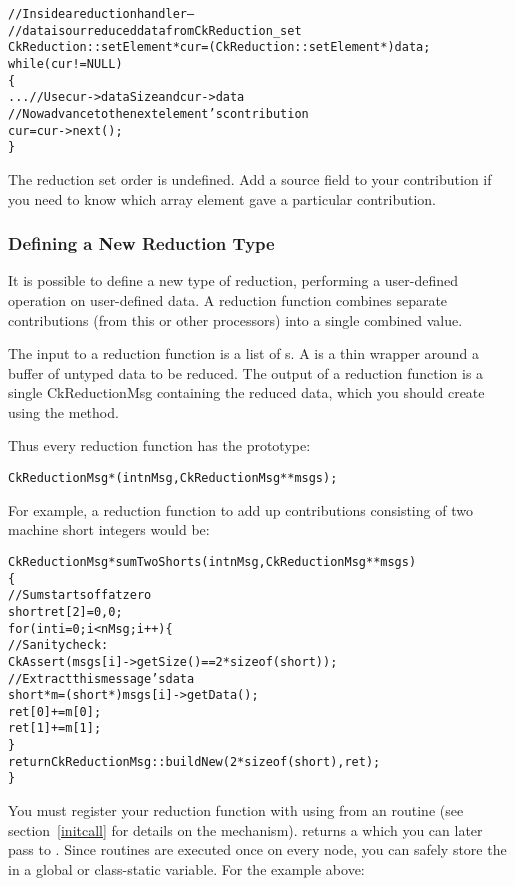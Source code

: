 \begin{alltt}
  //Inside a reduction handler-- 
  //  data is our reduced data from CkReduction_set
  CkReduction::setElement *cur=(CkReduction::setElement *)data;
  while (cur!=NULL)
  \{
    ... //Use cur->dataSize and cur->data
    //Now advance to the next element's contribution
    cur=cur->next();
  \}
\end{alltt}

The reduction set order is undefined.  Add a source field to your contribution
if you need to know which array element gave a particular contribution.

\subsubsection{Defining a New Reduction Type}
\label{new_type_reduction}

It is possible to define a new type of reduction, performing a 
user-defined operation on user-defined data.  A reduction function
combines separate contributions (from this or other processors)
into a single combined value.

The input to a reduction function is a list of s.
A  is a thin wrapper around a buffer of untyped data
to be reduced.  
The output of a reduction function is a single CkReductionMsg
containing the reduced data, which you should create using the
 method.  

Thus every reduction function has the prototype:
\begin{alltt}
CkReductionMsg *(int nMsg,CkReductionMsg **msgs);
\end{alltt}

For example, a reduction function to add up contributions 
consisting of two machine short integers would be:

\begin{alltt}
CkReductionMsg *sumTwoShorts(int nMsg,CkReductionMsg **msgs)
\{
  //Sum starts off at zero
  short ret[2]={0,0};
  for (int i=0;i<nMsg;i++) \{
    //Sanity check:
    CkAssert(msgs[i]->getSize()==2*sizeof(short));
    //Extract this message's data
    short *m=(short *)msgs[i]->getData();
    ret[0]+=m[0];
    ret[1]+=m[1];
  \}
  return CkReductionMsg::buildNew(2*sizeof(short),ret);
\}
\end{alltt}

You must register your reduction function with \charmpp{} 
using  from
an  routine (see section~\ref{initcall} for details
on the  mechanism).   
returns a  which you can later 
pass to .  Since  routines are executed
once on every node, you can safely store the 
in a global or class-static variable.  For the example above:

